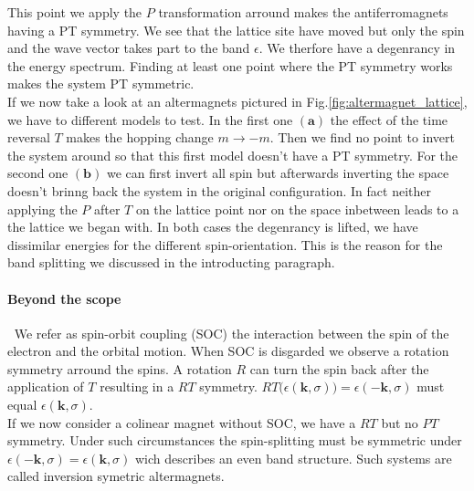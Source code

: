 \documentclass[../main.tex]{main.tex}
\begin{document}
This point we apply the $P$ transformation arround makes the antiferromagnets having a PT symmetry. We see that the lattice site have moved but only the spin and
the wave vector takes part to the band $\epsilon$. We therfore have a degenrancy in the energy spectrum. Finding at least one point where the PT 
symmetry works makes the system PT symmetric.\\

If we now take a look at an altermagnets pictured in Fig.\ref{fig:altermagnet_lattice}, we have to different models to test. In the first one $\bm{(a)}$
the effect of the time reversal $T$ makes the hopping change $m\rightarrow -m$. Then we find no point
to invert the system around so that this first model doesn't have a PT symmetry. For the second one $\bm{(b)}$
we can first invert all spin but afterwards inverting the space doesn't brinng back the system in the original configuration.
In fact neither applying the $P$ after $T$ on the lattice point nor on the space inbetween leads to a the lattice we began with. In both cases the 
degenrancy is lifted, we have dissimilar energies for the different spin-orientation. This is the reason for the band splitting we discussed in the introducting 
paragraph.\\

\paragraph{Beyond the scope} $~$ We refer as spin-orbit coupling (SOC) the interaction between the spin of the electron and the orbital motion. 
When SOC is disgarded we observe a rotation symmetry arround the spins. A rotation $R$ can turn the spin back after the application of $T$
resulting in a $RT$ symmetry. $RT\bigl(\epsilon(\bm{k},\sigma)\bigr) = \epsilon(-\bm{k},\sigma)$ must equal $\epsilon(\bm{k},\sigma)$.\\

If we now consider a colinear magnet without SOC, we have a $RT$ but no $PT$ symmetry. Under such circumstances the spin-splitting must be symmetric under 
$\epsilon(-\bm{k},\sigma) = \epsilon(\bm{k},\sigma)$ wich describes an even band structure. Such systems are called inversion symetric altermagnets.\\
\end{document}
